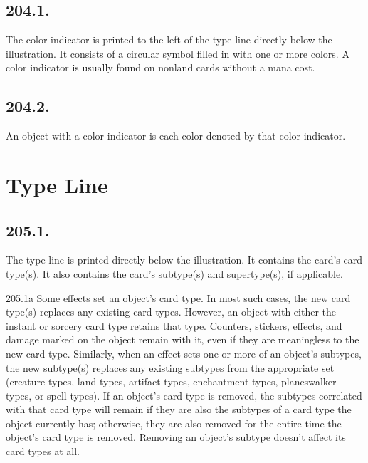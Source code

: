 \subsection*{204.1.}
The color indicator is printed to the left of the type line directly below the illustration. It consists of a circular symbol filled in with one or more colors. A color indicator is usually found on nonland cards without a mana cost.

\subsection*{204.2.}
An object with a color indicator is each color denoted by that color indicator.

\section{Type Line}
\subsection*{205.1.}
The type line is printed directly below the illustration. It contains the card’s card type(s). It also contains the card’s subtype(s) and supertype(s), if applicable.

205.1a Some effects set an object’s card type. In most such cases, the new card type(s) replaces any existing card types. However, an object with either the instant or sorcery card type retains that type. Counters, stickers, effects, and damage marked on the object remain with it, even if they are meaningless to the new card type. Similarly, when an effect sets one or more of an object’s subtypes, the new subtype(s) replaces any existing subtypes from the appropriate set (creature types, land types, artifact types, enchantment types, planeswalker types, or spell types). If an object’s card type is removed, the subtypes correlated with that card type will remain if they are also the subtypes of a card type the object currently has; otherwise, they are also removed for the entire time the object’s card type is removed. Removing an object’s subtype doesn’t affect its card types at all.

